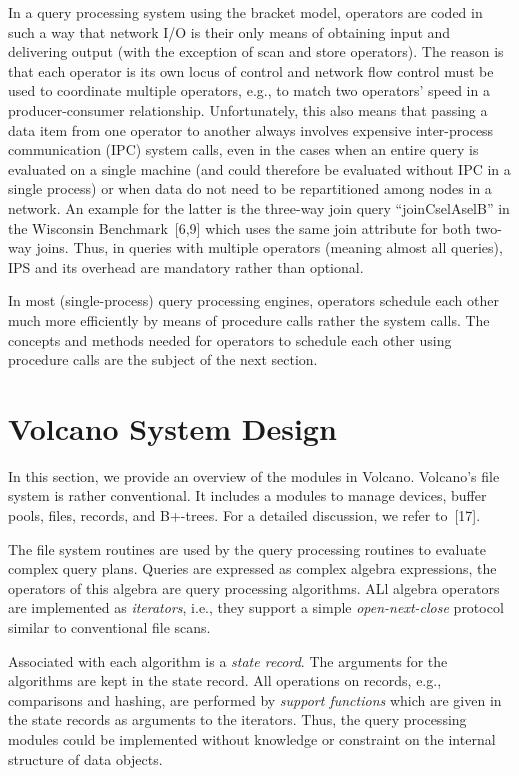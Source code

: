 \documentclass[a4paper,12pt,notitlepage,twoside,openright]{article}
\begin{document}
In a query processing system using the bracket
model, operators are coded in such a way that network I/O
is their only means of obtaining input and delivering output
(with the exception of scan and store operators). The reason
is that each operator is its own locus of control and
network flow control must be used to coordinate multiple
operators, e.g., to match two operators' speed in a
producer-consumer relationship. Unfortunately, this also
means that passing a data item from one operator to
another always involves expensive inter-process communication
(IPC) system calls, even in the cases when an entire
query is evaluated on a single machine (and could therefore
be evaluated without IPC in a single process) or when data
do not need to be repartitioned among nodes in a network.
An example for the latter is the three-way join query
``joinCselAselB'' in the Wisconsin Benchmark~{[6,9]} which
uses the same join attribute for both two-way joins. Thus,
in queries with multiple operators (meaning almost all
queries), IPS and its overhead are mandatory rather than optional.

In most (single-process) query processing engines,
operators schedule each other much more efficiently by
means of procedure calls rather the system calls. The concepts
and methods needed for operators to schedule each
other using procedure calls are the subject of the next section.

\section{Volcano System Design}

In this section, we provide an overview of the
modules in Volcano. Volcano's file system is rather conventional.
It includes a modules to manage devices, buffer
pools, files, records, and B+-trees. For a detailed discussion,
we refer to~{[17]}.

The file system routines are used by the query processing
routines to evaluate complex query plans. Queries
are expressed as complex algebra expressions, the operators
of this algebra are query processing algorithms. ALl algebra
operators are implemented as \emph{iterators}, i.e., they support a
simple \emph{open-next-close} protocol similar to conventional file scans.

Associated with each algorithm is a \emph{state record}.
The arguments for the algorithms are kept in the state
record. All operations on records, e.g., comparisons and
hashing, are performed by \emph{support functions} which are given
in the state records as arguments to the iterators. Thus, the
query processing modules could be implemented without
knowledge or constraint on the internal structure of data objects.
\end{document}
